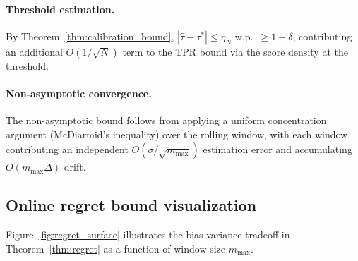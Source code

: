 \documentclass{article}
\theoremstyle{definition}
\begin{document}
\paragraph{Threshold estimation.} By Theorem~\ref{thm:calibration_bound}, $|\hat{\tau} - \tau^*| \leq \eta_N$ w.p.\ $\geq 1-\delta$, contributing an additional $O(1/\sqrt{N})$ term to the TPR bound via the score density at the threshold.

\paragraph{Non-asymptotic convergence.} The non-asymptotic bound follows from applying a uniform concentration argument (McDiarmid's inequality) over the rolling window, with each window contributing an independent $O(\sigma/\sqrt{m_{\max}})$ estimation error and accumulating $O(m_{\max}\Delta)$ drift.

\subsection{Online regret bound visualization}
\label{app:regret_viz}

Figure~\ref{fig:regret_surface} illustrates the bias-variance tradeoff in Theorem~\ref{thm:regret} as a function of window size $m_{\max}$.
\end{document}
